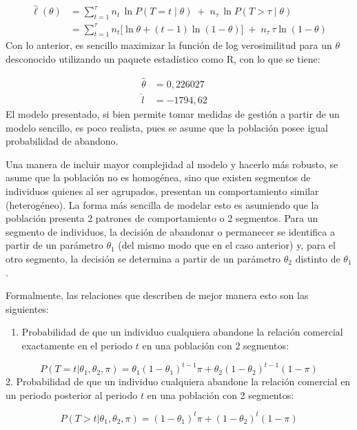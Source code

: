 \documentclass[
]{book}
\providecommand{\tightlist}{%
  \setlength{\itemsep}{0pt}\setlength{\parskip}{0pt}}
\begin{document}
\[
\begin{aligned}
\hat{\ell}(\theta)  &= \sum_{t=1}^{\tau} n_t \,\ln P(T=t \mid \theta)\;+\; n_{\tau}\,\ln P(T>\tau \mid \theta) \\  &= \sum_{t=1}^{\tau} n_t \big[\ln \theta + (t-1)\ln(1-\theta)\big]\;+\;n_{\tau}\,\tau\ln(1-\theta) \end{aligned}
\] Con lo anterior, es sencillo maximizar la función de log
verosimilitud para un \(\theta\) desconocido utilizando un paquete
estadístico como R, con lo que se tiene:

\[
\begin{aligned}
\hat{\theta} &= 0, 226027 \\
\hat{l} &= -1794,62
\end{aligned}
\quad \label{eq:homogeneo}
\]El modelo presentado, si bien permite tomar medidas de gestión a
partir de un modelo sencillo, es poco realista, pues se asume que la
población posee igual probabilidad de abandono.

Una manera de incluir mayor complejidad al modelo y hacerlo más robusto,
se asume que la población no es homogénea, sino que existen segmentos de
individuos quienes al ser agrupados, presentan un comportamiento similar
(heterogéneo). La forma más sencilla de modelar esto es asumiendo que la
población presenta 2 patrones de comportamiento o 2 segmentos. Para un
segmento de individuos, la decisión de abandonar o permanecer se
identifica a partir de un parámetro \(\theta_1\) (del mismo modo que en el
caso anterior) y, para el otro segmento, la decisión se determina a
partir de un parámetro \(\theta_2\) distinto de \(\theta_1\).

Formalmente, las relaciones que describen de mejor manera esto son las
siguientes:

\begin{enumerate}
\def\labelenumi{\arabic{enumi}.}
\tightlist
\item
  Probabilidad de que un individuo cualquiera abandone la relación
  comercial exactamente en el periodo \(t\) en una población con 2
  segmentos:
\end{enumerate}

\[P(T=t|\theta_1, \theta_2, \pi)= \theta_1 (1-\theta_1)^{t-1} \pi + \theta_2(1-\theta_2)^{t-1}(1-\pi)\]
2. Probabilidad de que un individuo cualquiera abandone la relación
comercial en un periodo posterior al periodo \(t\) en una población con 2
segmentos:

\[P(T>t|\theta_1, \theta_2, \pi)= (1-\theta_1)^{t} \pi + (1-\theta_2)^{t}(1-\pi)\]
\end{document}
